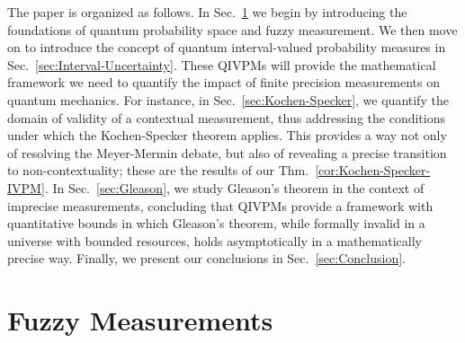 \documentclass[english,reprint, aps, prl,superscriptaddress, showpacs,
showkeys, longbibliography, amsmath, amssymb, floatfix]{revtex4-1}
\theoremstyle{plain}
\theoremstyle{definition}
\begin{document}
The paper is organized as follows.  In Sec.~\ref{sec:fuzzy} we begin
by introducing the foundations of quantum probability space and fuzzy
measurement.  We then move on to introduce the concept of quantum
interval-valued probability measures in
Sec.~\ref{sec:Interval-Uncertainty}.  These QIVPMs will provide the
mathematical framework we need to quantify the impact of finite
precision measurements on quantum mechanics.  For instance, in
Sec.~\ref{sec:Kochen-Specker}, we quantify the domain of validity of a
contextual measurement, thus addressing the conditions under which the
Kochen-Specker theorem applies.  This provides a way not only of
resolving the Meyer-Mermin debate, but also of revealing a precise
transition to non-contextuality; these are the results of our
Thm.~\ref{cor:Kochen-Specker-IVPM}.  In Sec.~\ref{sec:Gleason}, we
study Gleason's theorem in the context of imprecise measurements,
concluding that QIVPMs provide a framework with quantitative bounds in
which Gleason's theorem, while formally invalid in a universe with
bounded resources, holds asymptotically in a mathematically precise
way.  Finally, we present our conclusions in
Sec.~\ref{sec:Conclusion}.

\section{Fuzzy Measurements}
\label{sec:fuzzy}
\end{document}
